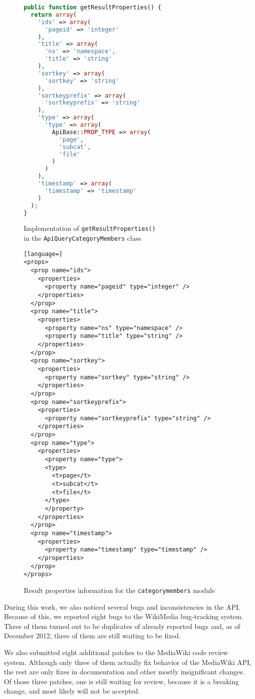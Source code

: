 \begin{figure}[htbp]
\begin{lstlisting}[language=php]
public function getResultProperties() {
  return array(
    'ids' => array(
      'pageid' => 'integer'
    ),
    'title' => array(
      'ns' => 'namespace',
      'title' => 'string'
    ),
    'sortkey' => array(
      'sortkey' => 'string'
    ),
    'sortkeyprefix' => array(
      'sortkeyprefix' => 'string'
    ),
    'type' => array(
      'type' => array(
        ApiBase::PROP_TYPE => array(
          'page',
          'subcat',
          'file'
        )
      )
    ),
    'timestamp' => array(
      'timestamp' => 'timestamp'
    )
  );
}
\end{lstlisting}

\caption{Implementation of \texttt{getResultProperties()} \\
in the \texttt{Api\-Query\-Category\-Members} class}
\label{paraminfo code}
\end{figure}

\begin{figure}[p]

\begin{lstlisting}[language=]
<props>
  <prop name="ids">
    <properties>
      <property name="pageid" type="integer" />
    </properties>
  </prop>
  <prop name="title">
    <properties>
      <property name="ns" type="namespace" />
      <property name="title" type="string" />
    </properties>
  </prop>
  <prop name="sortkey">
    <properties>
      <property name="sortkey" type="string" />
    </properties>
  </prop>
  <prop name="sortkeyprefix">
    <properties>
      <property name="sortkeyprefix" type="string" />
    </properties>
  </prop>
  <prop name="type">
    <properties>
      <property name="type">
      <type>
        <t>page</t>
        <t>subcat</t>
        <t>file</t>
      </type>
      </property>
    </properties>
  </prop>
  <prop name="timestamp">
    <properties>
      <property name="timestamp" type="timestamp" />
    </properties>
  </prop>
</props>
\end{lstlisting}

\caption{Result properties information for the \texttt{categorymembers} module}
\label{paraminfo props}
\end{figure}

During this work, we also noticed several bugs and inconsistencies in the \ac{API}.
Because of this, we reported eight bugs to the WikiMedia bug-tracking system.
Three of them turned out to be duplicates of already reported bugs and,
as of December 2012, three of them are still waiting to be fixed.

We also submitted eight additional patches to the MediaWiki code review system.
Although only three of them actually fix behavior of the MediaWiki \ac{API},
the rest are only fixes in documentation and other mostly insignificant changes.
Of those three patches, one is still waiting for review, because it is a breaking change,
and most likely will not be accepted.